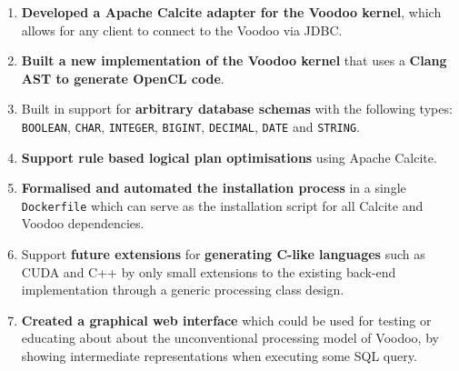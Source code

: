 \begin{enumerate}
    \item \textbf{Developed a Apache Calcite adapter for the Voodoo kernel}, which allows for any client to connect to the Voodoo via JDBC.
    
    \item \textbf{Built a new implementation of the Voodoo kernel} that uses a \textbf{Clang AST to generate OpenCL code}.

    \item Built in support for \textbf{arbitrary database schemas} with the following types: \texttt{BOOLEAN}, \texttt{CHAR}, \texttt{INTEGER}, \texttt{BIGINT}, \texttt{DECIMAL}, \texttt{DATE} and \texttt{STRING}.
    
    \item \textbf{Support rule based logical plan optimisations} using Apache Calcite.
    
    \item \textbf{Formalised and automated the installation process} in a single \texttt{Dockerfile} which can serve as the installation script for all Calcite and Voodoo dependencies.
    
    \item Support \textbf{future extensions} for \textbf{generating C-like languages} such as CUDA and C++ by only small extensions to the existing back-end implementation through a generic processing class design.
    
    \item \textbf{Created a graphical web interface} which could be used for testing or educating about about the unconventional processing model of Voodoo, by showing intermediate representations when executing some SQL query.
\end{enumerate}







